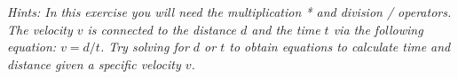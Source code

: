\textit{Hints:
In this exercise you will need the multiplication * and division / operators.
The velocity $v$ is connected to the distance $d$ and the time $t$ via the following equation: $v = d/t$. Try solving for $d$ or $t$ to obtain equations to calculate time and distance given a specific velocity $v$.}\\[1cm]

